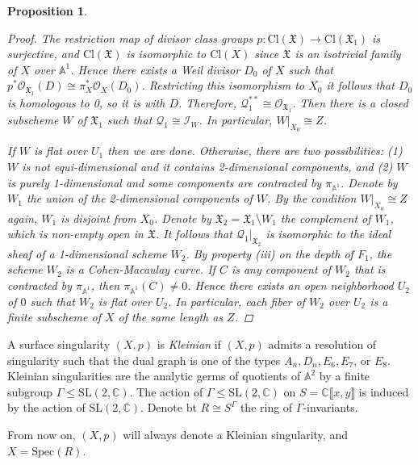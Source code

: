 \documentclass{amsart}[12pt]
\newtheorem{prop}[theorem]{Proposition}
\theoremstyle{definition}
\theoremstyle{remark}
\numberwithin{equation}{section}
\begin{document}
\begin{prop}
\begin{proof}
The restriction map of divisor class groups $p: \mathrm{Cl}(\mathfrak{X}) \to \mathrm{Cl}(\mathfrak{X}_1)$ is surjective, and $\mathrm{Cl}(\mathfrak{X})$ is isomorphic to $\mathrm{Cl}(X)$ since $\mathfrak{X}$ is an isotrivial family of $X$ over $\mathbb{A}^1$. Hence there exists a Weil divisor $D_0$ of $X$ such that $p^* \mathcal{O}_{\mathfrak{X}_1}(D) \cong \pi_X^*\mathcal{O}_{X}(D_0)$. Restricting this isomorphism to $X_0$ it follows that $D_0$ is homologous to 0, so it is with $D$. Therefore, $\mathcal{Q}_1^{**} \cong \mathcal{O}_{\mathfrak{X}_1}$. Then there is a closed subscheme $W$ of $\mathfrak{X}_1$ such that $\mathcal{Q}_1 \cong \mathcal{I}_W$. In particular, $W \vert_{X_0} \cong Z$.

If $W$ is flat over $U_1$ then we are done. Otherwise, there are two possibilities: (1) $W$ is not equi-dimensional and it contains 2-dimensional components, and (2) $W$ is purely 1-dimensional and some components are contracted by $\pi_{\mathbb{A}^1}$. Denote by $W_1$ the union of the 2-dimensional components of $W$. By the condition $W \vert_{X_0} \cong Z$ again, $W_1$ is disjoint from $X_0$. Denote by $\mathfrak{X}_2 = \mathfrak{X}_1 \setminus W_1$ the complement of $W_1$, which is non-empty open in $\mathfrak{X}$. It follows that $\mathcal{Q}_1 \vert_{\mathfrak{X}_2}$ is isomorphic to the ideal sheaf of a 1-dimensional scheme $W_2$. By property (iii) on the depth of $F_1$, the scheme $W_2$ is a Cohen-Macaulay curve. If $C$ is any component of $W_2$ that is contracted by $\pi_{\mathbb{A}^1}$, then $\pi_{\mathbb{A}^1}(C) \neq 0$. Hence there exists an open neighborhood $U_2$ of $0$ such that $W_2$ is flat over $U_2$. In particular, each fiber of $W_2$ over $U_2$ is a finite subscheme of $X$ of the same length as $Z$.
\end{proof}
\end{prop}

A surface singularity $(X, p)$ is \textit{Kleinian} if $(X, p)$ admits a resolution of singularity such that the dual graph is one of the types $A_n, D_n, E_6, E_7$, or $E_8$. Kleinian singularities are the analytic germs of quotients of $\mathbb{A}^2$ by a finite subgroup $\Gamma \leq \mathrm{SL}(2, \mathbb{C})$. The action of $\Gamma \leq \mathrm{SL}(2, \mathbb{C})$ on $S = \mathbb{C}\llbracket x, y\rrbracket$ is induced by the action of $\mathrm{SL}(2, \mathbb{C})$. Denote bt $R \cong S^{\Gamma}$ the ring of $\Gamma$-invariants. 

From now on, $(X, p)$ will always denote a Kleinian singularity, and $X = \mathrm{Spec}(R)$.
\end{document}
